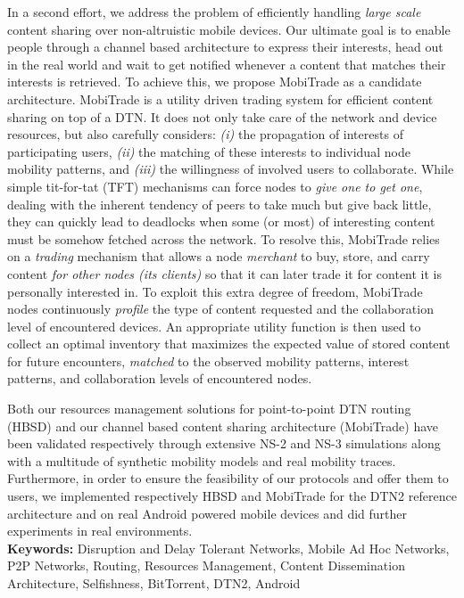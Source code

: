 \documentclass[a4paper,11pt,twoside]{ThesisStyle}
\begin{document}
In a second effort, we address the problem of efficiently handling \emph{large scale} content sharing over non-altruistic mobile devices. Our ultimate goal is to enable people through a channel based architecture to express their interests, head out in the real world and wait to get notified whenever a content that matches their interests is retrieved. To achieve this, we propose MobiTrade as a candidate architecture. MobiTrade is a utility driven trading system for efficient content sharing on top of a DTN. It does not only take care of the network and device resources, but also carefully considers: \emph{(i)} the propagation of interests of participating users, \emph{(ii)} the matching of these interests to individual node mobility patterns, and \emph{(iii)} the willingness of involved users to collaborate. While simple tit-for-tat (TFT) mechanisms can force nodes to \emph{give one to get one}, dealing with the inherent tendency of peers to take much but give back little, they can quickly lead to deadlocks when some (or most) of interesting content must be somehow fetched across the network. To resolve this, MobiTrade relies on a \emph{trading} mechanism that allows a node \emph{merchant} to buy, store, and carry content \emph{for other nodes  (its clients)} so that it can later trade it for content it is personally interested in. To exploit this extra degree of freedom, MobiTrade nodes continuously \emph{profile} the type of content requested and the collaboration level of encountered devices. An appropriate utility function is then used to collect an optimal inventory that maximizes the expected value of stored content for future encounters, \emph{matched} to the observed mobility patterns, interest patterns, and collaboration levels of encountered nodes. 

Both our resources management solutions for point-to-point DTN routing (HBSD) and our channel based content sharing architecture (MobiTrade) have been validated respectively through extensive NS-2 and NS-3 simulations along with a multitude of synthetic mobility models and real mobility traces. Furthermore, in order to ensure the feasibility of our protocols and offer them to users, we implemented respectively HBSD and MobiTrade for the DTN2 reference architecture and on real Android powered mobile devices and did further experiments in real environments.  
\\
{\large\textbf{Keywords:}}
Disruption and Delay Tolerant Networks, Mobile Ad Hoc Networks, P2P Networks, Routing, Resources Management, Content Dissemination Architecture, Selfishness, BitTorrent, DTN2, Android  

\tableofcontents

\mainmatter










%

%



\end{document}

